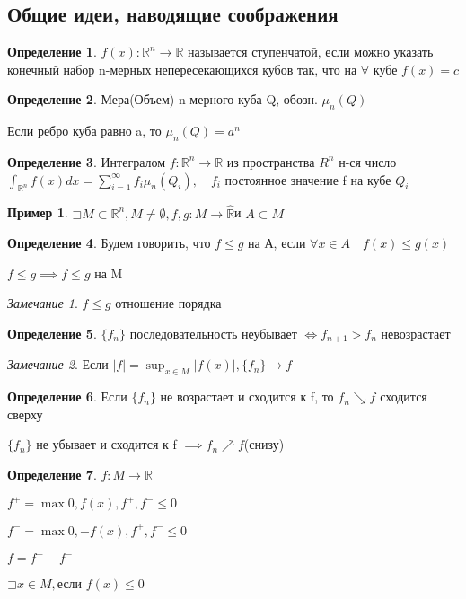 \documentclass[a4paper, 12pt]{article}
\newcommand\letsymbol{\mathord{\sqsupset}}
\theoremstyle{definition}
\newtheorem*{example}{Пример}
\newtheorem*{definition}{Определение}
\theoremstyle{remark}
\newtheorem*{remark}{Замечание}
\begin{document}
\subsection{Общие идеи, наводящие соображения}
\begin{definition}
     $f(x):\mathbb{R}^n \to \mathbb{R} $ называется ступенчатой, если можно указать
     конечный набор n-мерных непересекающихся кубов так, что на $\forall$ кубе $f(x) = c$
\end{definition}
\begin{definition}
     Мера(Объем) n-мерного куба Q, обозн. $\mu_n(Q)$

     Если ребро куба равно a, то $\mu_n(Q) = a^n$
\end{definition}
\begin{definition}
     Интегралом $f:\mathbb{R}^n\to\mathbb{R}$ из пространства $R^n$ н-ся число
     $\int_{\mathbb{R}^n}f(x)dx = \sum_{i = 1}^{\infty} f_i\mu_n(Q_i), \quad f_i$ постоянное значение f на кубе $Q_i$
\end{definition}
\begin{example}
     $\letsymbol{} M \subset \mathbb{R}^n, M \neq \emptyset, f, g: M\to \widehat{\mathbb{R}} $и $A\subset M$
\end{example}
\begin{definition}
     Будем говорить, что $f\leq g$ на А, если $\forall x\in A\quad f(x)\leq g(x)$

     $f\leq g\implies f\leq g$ на M
\end{definition}
\begin{remark}
     $f\leq g$ отношение порядка 
\end{remark}
\begin{definition}
     $\{f_n\}$ последовательность неубывает $\Leftrightarrow f_{n+1}> f_n$ невозрастает
\end{definition}
\begin{remark}
     Если $|f| = \sup_{x\in M} |f(x)|, \{f_n\}\to f$
\end{remark}
\begin{definition}
     Если $\{f_n\}$ не возрастает и сходится к f, то $f_n \searrow f$ сходится сверху
     
     $\{f_n\}$ не убывает и сходится к f $\implies f_n\nearrow f$(снизу)
\end{definition}
\begin{definition}
     $f:M\to\mathbb{R} $

     $f^{+} = \max{0, f(x)}, f^{+}, f^{-}\leq 0$

     $f^{-} = \max{0, -f(x)}, f^{+}, f^{-}\leq 0$

     $f = f^{+} - f^{-}$
\end{definition}
$\letsymbol x\in M,$если $f(x)\leq 0$
\end{document}
